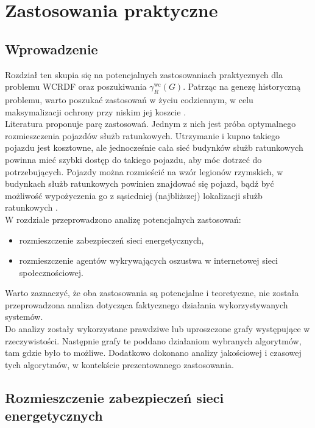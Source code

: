 \chapter{Zastosowania praktyczne}

\section{Wprowadzenie}

Rozdział ten skupia się na potencjalnych zastosowaniach praktycznych dla problemu WCRDF oraz poszukiwania $\gamma^{\text{wc}}_R(G)$. Patrząc na genezę historyczną problemu, warto poszukać zastosowań w życiu codziennym, w celu maksymalizacji ochrony przy niskim jej koszcie \cite{theoryWCRDF}.\\
Literatura proponuje parę zastosowań. Jednym z nich jest próba optymalnego rozmieszczenia pojazdów służb ratunkowych. Utrzymanie i kupno takiego pojazdu jest kosztowne, ale jednocześnie cała sieć budynków służb ratunkowych powinna mieć szybki dostęp do takiego pojazdu, aby móc dotrzeć do potrzebujących. Pojazdy można rozmieścić na wzór legionów rzymskich, w budynkach służb ratunkowych powinien znajdować się pojazd, bądź być możliwość wypożyczenia go z sąsiedniej (najbliższej) lokalizacji służb ratunkowych \cite{improvedILP}.\\
W rozdziale przeprowadzono analizę potencjalnych zastosowań:
\begin{itemize}
    \item rozmieszczenie zabezpieczeń sieci energetycznych,
    \item rozmieszczenie agentów wykrywających oszustwa w internetowej sieci
    społecznościowej.
\end{itemize}
Warto zaznaczyć, że oba zastosowania są potencjalne i teoretyczne, nie została przeprowadzona analiza dotycząca faktycznego działania wykorzystywanych systemów.\\
Do analizy zostały wykorzystane prawdziwe lub uproszczone grafy występujące w rzeczywistości. Następnie grafy te poddano działaniom wybranych algorytmów, tam gdzie było to możliwe. Dodatkowo dokonano analizy jakościowej i czasowej tych algorytmów, w kontekście prezentowanego zastosowania.

\section{Rozmieszczenie zabezpieczeń sieci energetycznych}

